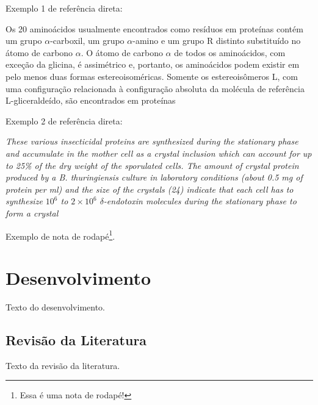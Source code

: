 \documentclass[
	article,			%
	11pt,				%
	oneside,			%
	a4paper,			%
	chapter=TITLE,		%
	section=TITLE,		%
	english,			%
	brazil,				%
	sumario=tradicional
]{abntex2}
\begin{document}
	
	Exemplo 1 de referência direta:
	
	\begin{citacao}
		Os 20 aminoácidos usualmente encontrados como resíduos em proteínas contém um grupo $\alpha$-carboxil, um grupo $\alpha$-amino e um grupo R distinto substituído no átomo de carbono $\alpha$. O átomo de carbono $\alpha$ de todos os aminoácidos, com exceção da glicina, é assimétrico e, portanto, os aminoácidos podem existir em pelo menos duas formas estereoisoméricas. Somente os estereoisômeros L, com uma configuração relacionada à configuração absoluta da molécula de referência L-gliceraldeído, são encontrados em proteínas \cite[p. 81]{Nelson2014}
	\end{citacao}
	
	Exemplo 2 de referência direta:
	
	\begin{citacao}
		\textit{These various insecticidal proteins are synthesized during the stationary phase and accumulate in the mother cell as a crystal inclusion which can account for up to 25\% of the dry weight of the sporulated cells. The amount of crystal protein produced by a B. thuringiensis culture in laboratory conditions (about 0.5 mg of protein per ml) and the size of the crystals (24) indicate that each cell has to synthesize $10^6$ to $2 \times 10^6$ $\delta$-endotoxin molecules during the stationary phase to form a crystal} \cite[p. 1]{Agaisse1995}
	\end{citacao}
	
	Exemplo de nota de rodapé\footnote{Essa é uma nota de rodapé!}.
	
    
    

	\section{Desenvolvimento}
    	
     Texto do desenvolvimento.
     
     
     
     
     \subsection{Revisão da Literatura}
     
     Texto da revisão da literatura.
     
\end{document}
